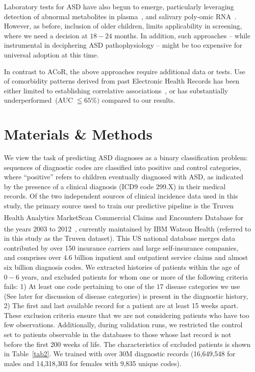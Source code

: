 \documentclass[onecolumn,10pt]{IEEEtran}
\def\acor{ACoR\xspace}
\begin{document}
Laboratory tests for ASD have also begun to emerge, particularly leveraging detection of abnormal metabolites in plasma~\cite{smith2020metabolomics,howsmon2017classification}, and  salivary poly-omic RNA~\cite{hicks2018validation}. However, as before, inclusion  of older children, limits  applicability in  screening, where we need a decision at $18-24$ months. In addition, such approaches -- while  instrumental in deciphering ASD pathophysiology -- might be too expensive for universal adoption at this time.

In contrast to \acor, the above approaches require additional data or tests. Use of comorbidity patterns derived from past  Electronic Health Records  has been either limited to establishing correlative associations~\cite{doshi2014comorbidity,bishop2018using}, or has substantially underperformed~\cite{lingren2016electronic}(AUC $\leqq 65\%)$ compared to our results.

\section*{Materials \& Methods}
We view the task of predicting  ASD diagnoses   as a binary classification problem: sequences of diagnostic codes are classified into positive and control categories, where ``positive'' refers to children eventually diagnosed with ASD, as indicated by the presence of a clinical diagnosis (ICD9 code 299.X) in their medical records. Of the two independent sources of clinical incidence data used in this study,  the primary source used to train our predictive pipeline  is the Truven Health Analytics MarketScan\textsuperscript{\textregistered} Commercial Claims and Encounters Database for the years 2003 to 2012~\cite{hansen2017truven}, currently maintained by IBM\textsuperscript{\textregistered} Watson Health (referred to in this study  as the Truven dataset). This US national database merges  data contributed by over 150 insurance carriers and large self-insurance companies,  and comprises over  4.6 billion inpatient and outpatient service claims and  almost six billion diagnosis codes. We extracted histories of patients within the age of $0-6$ years, and excluded  patients for whom one or more of the following criteria fails:  1) At least one code pertaining to one of the $17$ disease categories we use (See later for discussion of disease categories) is present in the diagnostic history, 2) The first and last available record for a patient are  at least 15 weeks apart. These exclusion criteria ensure that we are not considering patients who have too few observations. Additionally, during validation runs,  we restricted the control set to patients observable in the databases to those whose last record is not before the first 200 weeks of life. The characteristics of excluded patients is shown in Table~\ref{tab2}. We trained with over  30M diagnostic records (16,649,548 for males and  14,318,303  for females with 9,835 unique  codes).
\end{document}
